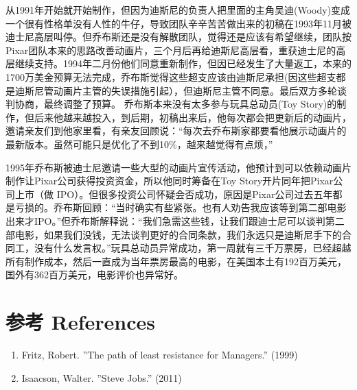 从1991年开始就开始制作，但因为迪斯尼的负责人把里面的主角吴迪(Woody)变成一个很有性格单没有人性的牛仔，导致团队辛辛苦苦做出来的初稿在1993年11月被迪士尼高层叫停。但乔布斯还是没有解散团队，觉得还是应该有希望继续，团队按Pixar团队本来的思路改善动画片，三个月后再给迪斯尼高层看，重获迪士尼的高层继续支持。1994年二月份他们同意重新制作，但因已经发生了大量返工，本来的1700万美金预算无法完成，乔布斯觉得这些超支应该由迪斯尼承担(因这些超支都是迪斯尼管动画片主管的失误措施引起），但迪斯尼主管不同意。最后双方多轮谈判协商，最终调整了预算。
乔布斯本来没有太多参与玩具总动员(Toy
Story)的制作，但后来他越来越投入，到后期，初稿出来后，他每次都会把更新后的动画片，邀请亲友们到他家里看，有亲友回顾说：``每次去乔布斯家都要看他展示动画片的最新版本。虽然可能只是优化了不到10\%，越来越觉得有点烦，''

1995年乔布斯被迪士尼邀请一些大型的动画片宣传活动，他预计到可以依赖动画片制作让Pixar公司获得投资资金，所以他同时筹备在Toy
Story开片同年把Pixar公司上市（做
IPO）。但很多投资公司怀疑会否成功，原因是Pixar公司过去五年都是亏损的。乔布斯回顾：``当时确实有些紧张。也有人劝告我应该等到第二部电影出来才IPO。''但乔布斯解释说：``我们急需这些钱，让我们跟迪士尼可以谈判第二部电影，如果我们没钱，无法谈判更好的合同条款，我们永远只是迪斯尼手下的合同工，没有什么发言权。''玩具总动员异常成功，第一周就有三千万票房，已经超越所有制作成本，然后一直成为当年票房最高的电影，在美国本土有192百万美元，国外有362百万美元，电影评价也异常好。

\hypertarget{ux9644ux4ef6}{%
\section{参考 References}\label{ux9644ux4ef6}}

\begin{enumerate}
\tightlist
\item
  Fritz, Robert. ''The path of least resistance for Managers.'' (1999)
\item
  Isaacson, Walter. ''Steve Jobs.'' (2011)
\end{enumerate}




